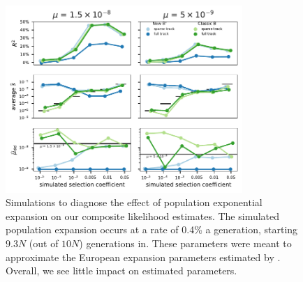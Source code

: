 \documentclass[11pt]{article}
\begin{document}
\begin{figure}[htbp]
    \label{suppfig:sim-exp}
  \centering
  \includegraphics[width=0.8\textwidth]{figures/supplementary/subfigure_sim_mle_expansion.pdf}

  \caption{Simulations to diagnose the effect of population exponential
      expansion on our composite likelihood estimates. The simulated population
      expansion occurs at a rate of 0.4\% a generation, starting $9.3N$ (out of
      $10N$) generations in. These parameters were meant to approximate the
  European expansion parameters estimated by \textcite{Gutenkunst2009-pg}.
Overall, we see little impact on estimated parameters.}

\end{figure}
\end{document}
